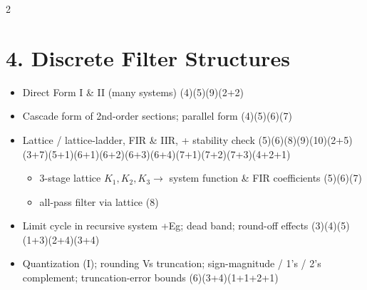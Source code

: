 \documentclass[10pt]{article}
\begin{document}
\begin{multicols}{2}
\section*{4. Discrete Filter Structures}
\begin{itemize}
  \item Direct Form I \& II (many systems) \hfill (4)\allowbreak(5)\allowbreak(9)\allowbreak(2+2)
  \item Cascade form of 2nd-order sections; parallel form \hfill (4)\allowbreak(5)\allowbreak(6)\allowbreak(7)
  \item Lattice / lattice-ladder, FIR \& IIR, + stability check \hfill (5)\allowbreak(6)\allowbreak(8)\allowbreak(9)\allowbreak(10)\allowbreak(2+5)\allowbreak(3+7)\allowbreak(5+1)\allowbreak(6+1)\allowbreak(6+2)\allowbreak(6+3)\allowbreak(6+4)\allowbreak(7+1)\allowbreak(7+2)\allowbreak(7+3)\allowbreak(4+2+1)
    \begin{itemize}
      \item 3-stage lattice $K_1,K_2,K_3\to$ system function \& FIR coefficients \hfill (5)\allowbreak(6)\allowbreak(7)
      \item all-pass filter via lattice \hfill (8)
    \end{itemize}
  \item Limit cycle in recursive system +Eg; dead band; round-off effects \hfill (3)\allowbreak(4)\allowbreak(5)\allowbreak(1+3)\allowbreak(2+4)\allowbreak(3+4)
  \item Quantization (I); rounding Vs truncation; sign-magnitude / 1's / 2's complement; truncation-error bounds \hfill (6)\allowbreak(3+4)\allowbreak(1+1+2+1)
\end{itemize}


\end{multicols}
\end{document}

